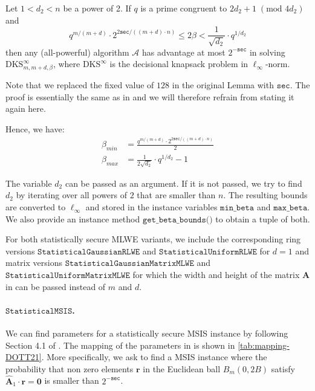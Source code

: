 \begin{theorem}
    Let $1 < d_2 < n$ be a power of 2. If $q$ is a prime congruent to $2d_2 + 1 \;(\text{mod } 4d_2)$ and
    \begin{equation}
        q^{m/(m+d)} \cdot 2^{2 \texttt{sec}/((m+d)\cdot n)} \leq 2 \beta < \frac{1}{\sqrt{d_2}} \cdot q^{1/d_2}
    \end{equation}
    then any (all-powerful) algorithm $\mathcal{A}$ has advantage at most $2^{-\texttt{sec}}$ in solving $\text{DKS}_{m,m+d,\beta}^\infty$, where $\text{DKS}^\infty$ is the decisional knapsack problem in $\ell_\infty$-norm.
\end{theorem}
Note that we replaced the fixed value of $128$ in the original Lemma with $\texttt{sec}$. The proof is essentially the same as in \cite{BDLOP18} and we will therefore refrain from stating it again here.


Hence, we have:
\begin{align}
    \beta_{min} & = \frac{q^{m/(m+d)} \cdot 2^{2 \texttt{sec}/((m+d)\cdot n)}}{2} \\
    \beta_{max} & = \frac{1}{2\sqrt{d_2}} \cdot q^{1/d_2} - 1
\end{align}

The variable $d_2$ can be passed as an argument. If it is not passed, we try to find $d_2$ by iterating over all powers of $2$ that are smaller than $n$.
The resulting bounds are converted to $\ell_\infty$ and stored in the instance variables $\texttt{min\_beta}$ and $\texttt{max\_beta}$. We also provide an instance method $\texttt{get\_beta\_bounds()}$ to obtain a tuple of both.

For both statistically secure MLWE variants, we include the corresponding ring versions $\texttt{StatisticalGaussianRLWE}$ and $\texttt{StatisticalUniformRLWE}$ for $d=1$ and matrix versions $\texttt{StatisticalGaussianMatrixMLWE}$ and $\texttt{StatisticalUniformMatrixMLWE}$ for which the width and height of the matrix $\mathbf{A}$ in \cite{LPR13} can be passed instead of $m$ and $d$. %


\paragraph{$\texttt{StatisticalMSIS}$.} We can find parameters for a statistically secure MSIS instance by following Section 4.1 of \cite{DOTT21}. The mapping of the parameters in \cite{DOTT21} is shown in \cref{tab:mapping-DOTT21}. More specifically, we ask to find a MSIS instance where the probability that non zero elements $\mathbf{r}$ in the Euclidean ball $B_{m}(0, 2B)$ satisfy $\hat{\mathbf{A}}_1 \cdot \mathbf{r} = \mathbf{0}$ is smaller than $2^{-\texttt{sec}}$. %

